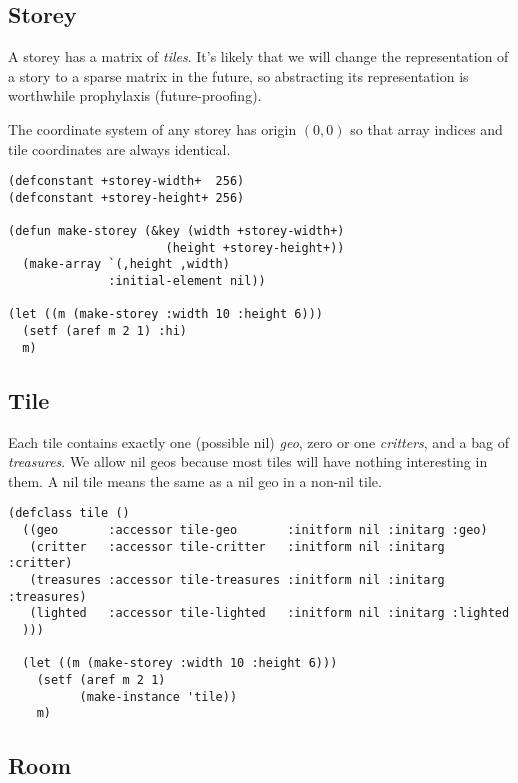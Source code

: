 \documentclass[10pt,oneside,x11names]{article}
\begin{document}
\subsection{Storey}
\label{sec:orgheadline10}

A storey has a matrix of \emph{tiles}. 
It's likely that we will change the representation of a story to 
a sparse matrix in the future, so abstracting its representation
is worthwhile prophylaxis (future-proofing).

The coordinate system of any storey has origin \((0, 0)\) so that array indices
and tile coordinates are always identical.

\begin{verbatim}
(defconstant +storey-width+  256)
(defconstant +storey-height+ 256)

(defun make-storey (&key (width +storey-width+)
                      (height +storey-height+))
  (make-array `(,height ,width)
              :initial-element nil))

(let ((m (make-storey :width 10 :height 6)))
  (setf (aref m 2 1) :hi)
  m)
\end{verbatim}

\subsection{Tile}
\label{sec:orgheadline11}

Each tile contains exactly one (possible nil)
\emph{geo}, zero or one \emph{critters}, and a bag of \emph{treasures}. We allow nil geos
because most tiles will have nothing interesting in them. A nil tile means the
same as a nil geo in a non-nil tile.

\begin{verbatim}
(defclass tile ()
  ((geo       :accessor tile-geo       :initform nil :initarg :geo)
   (critter   :accessor tile-critter   :initform nil :initarg :critter)
   (treasures :accessor tile-treasures :initform nil :initarg :treasures)
   (lighted   :accessor tile-lighted   :initform nil :initarg :lighted
  )))

  (let ((m (make-storey :width 10 :height 6)))
    (setf (aref m 2 1)
          (make-instance 'tile))
    m)
\end{verbatim}

\subsection{Room}
\label{sec:orgheadline12}
\end{document}
